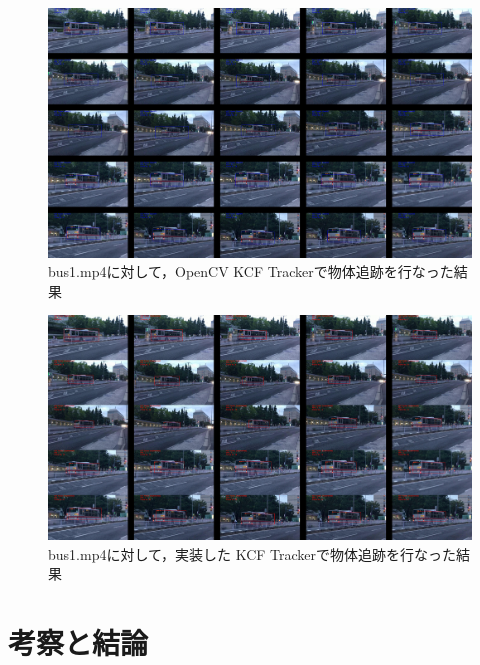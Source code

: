 \documentclass[11pt,a4j]{jarticle}
\begin{document}
    \begin{figure}[hbtp]
      \begin{center}
        \includegraphics[clip,width=12.5cm]{./figures/bus1_kcf_opencv.jpg}
        \caption{bus1.mp4に対して，OpenCV KCF Trackerで物体追跡を行なった結果}
        \label{fig:bus1_opencv}
      \end{center}
    \end{figure}

    \begin{figure}[htbp]
      \begin{center}
        \includegraphics[clip,width=12.5cm]{./figures/bus1_kcf_impl.jpg}
        \caption{bus1.mp4に対して，実装した KCF Trackerで物体追跡を行なった結果}
        \label{fig:bus1_impl}
      \end{center}
    \end{figure}

    \newpage
  
  \section{考察と結論}
\end{document}
